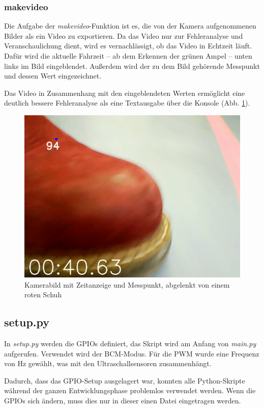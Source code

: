 \documentclass[a4paper, 12pt]{scrartcl}
\begin{document}
\subsubsection{makevideo}


Die Aufgabe der \textit{makevideo}-Funktion ist es, die von der Kamera aufgenommenen Bilder als ein Video zu exportieren. Da das Video nur zur Fehleranalyse und Veranschaulichung dient, wird es vernachlässigt, ob das Video in Echtzeit läuft. Dafür wird die aktuelle Fahrzeit -- ab dem Erkennen der grünen Ampel -- unten links im Bild eingeblendet. Außerdem wird der zu dem Bild gehörende Messpunkt und dessen Wert eingezeichnet.

Das Video in Zusammenhang mit den eingeblendeten Werten ermöglicht eine deutlich bessere Fehleranalyse als eine Textausgabe über die Konsole (Abb. \ref{schuh_im_bild}).

\begin{figure}[H] 
	\centering
	\includegraphics[width=.5\textwidth]{schuh_im_bild.png}
	\caption{Kamerabild mit Zeitanzeige und Messpunkt, abgelenkt von einem roten Schuh}
	\label{schuh_im_bild}
\end{figure}

\subsection{setup.py}


In \textit{setup.py} werden die GPIOs definiert, das Skript wird am Anfang von \textit{main.py} aufgerufen. Verwendet wird der BCM-Modus. Für die PWM wurde eine Frequenz von \unit[73]{Hz} gewählt, was mit den Ultraschallsensoren zusammenhängt.

Dadurch, dass das GPIO-Setup ausgelagert war, konnten alle Python-Skripte während der ganzen Entwicklungsphase problemlos verwendet werden. Wenn die GPIOs sich ändern, muss dies nur in dieser einen Datei eingetragen werden.
\end{document}
